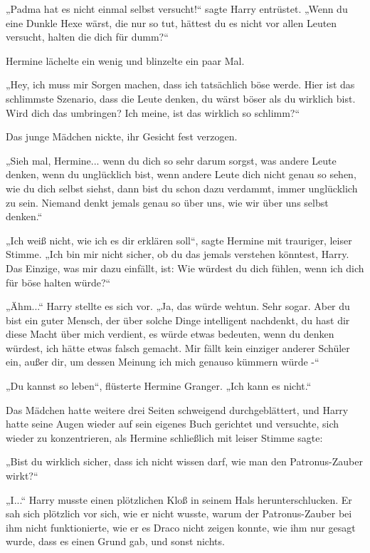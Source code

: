 {„Padma hat es nicht einmal selbst versucht!“ sagte Harry entrüstet. „Wenn du eine Dunkle Hexe wärst, die nur so tut, hättest du es nicht vor allen Leuten versucht, halten die dich für dumm?“

Hermine lächelte ein wenig und blinzelte ein paar Mal.

„Hey, ich muss mir Sorgen machen, dass ich tatsächlich böse werde. Hier ist das schlimmste Szenario, dass die Leute denken, du wärst böser als du wirklich bist. Wird dich das umbringen? Ich meine, ist das wirklich so schlimm?“

Das junge Mädchen nickte, ihr Gesicht fest verzogen.

„Sieh mal, Hermine... wenn du dich so sehr darum sorgst, was andere Leute denken, wenn du unglücklich bist, wenn andere Leute dich nicht genau so sehen, wie du dich selbst siehst, dann bist du schon dazu verdammt, immer unglücklich zu sein. Niemand denkt jemals genau so über uns, wie wir über uns selbst denken.“

„Ich weiß nicht, wie ich es dir erklären soll“, sagte Hermine mit trauriger, leiser Stimme. „Ich bin mir nicht sicher, ob du das jemals verstehen könntest, Harry. Das Einzige, was mir dazu einfällt, ist: Wie würdest du dich fühlen, wenn ich dich für böse halten würde?“

„Ähm...“ Harry stellte es sich vor. „Ja, das würde wehtun. Sehr sogar. Aber du bist ein guter Mensch, der über solche Dinge intelligent nachdenkt, du hast dir diese Macht über mich verdient, es würde etwas bedeuten, wenn du denken würdest, ich hätte etwas falsch gemacht. Mir fällt kein einziger anderer Schüler ein, außer dir, um dessen Meinung ich mich genauso kümmern würde -“

„Du kannst so leben“, flüsterte Hermine Granger. „Ich kann es nicht.“

Das Mädchen hatte weitere drei Seiten schweigend durchgeblättert, und Harry hatte seine Augen wieder auf sein eigenes Buch gerichtet und versuchte, sich wieder zu konzentrieren, als Hermine schließlich mit leiser Stimme sagte:

„Bist du wirklich sicher, dass ich nicht wissen darf, wie man den Patronus-Zauber wirkt?“

„I...“ Harry musste einen plötzlichen Kloß in seinem Hals herunterschlucken. Er sah sich plötzlich vor sich, wie er nicht wusste, warum der Patronus-Zauber bei ihm nicht funktionierte, wie er es Draco nicht zeigen konnte, wie ihm nur gesagt wurde, dass es einen Grund gab, und sonst nichts.

}
